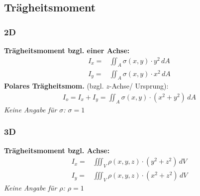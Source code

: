 \subsection{Trägheitsmoment}
    \subsubsection{2D}
        \textbf{Trägheitsmoment bzgl. einer Achse:}
        \begin{align*}
            I_x =& \iint_A \sigma(x,y) \cdot y^2 \, dA\\
            I_y =& \iint_A \sigma(x,y) \cdot x^2 \, dA
        \end{align*}
        \textbf{Polares Trägheitsmom.} (bzgl. $z$-Achse/ Ursprung):
        \begin{align*}
            I_o = I_x + I_y = \iint_A \sigma(x,y) \cdot (x^2 + y^2) \, dA 
        \end{align*}
        \textit{Keine Angabe für $\sigma$: $\sigma = 1$}

    \subsubsection{3D}
        \textbf{Trägheitsmoment bzgl. Achse:}
        \begin{align*}
            I_x =& \iiint_V \rho(x,y,z) \cdot (y^2 + z^2) \, dV\\
            I_y =& \iiint_V \rho(x,y,z) \cdot (x^2 + z^2) \, dV
        \end{align*}
        \textit{Keine Angabe für $\rho$: $\rho = 1$}
        
